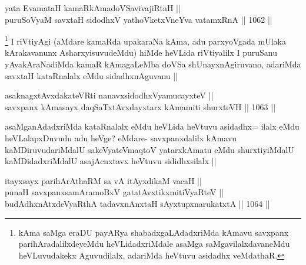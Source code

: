 
\begin{shl}
yata EvamataH kamaRkAmadoVSavivajiRtaH || \\
puruSoV\s yaM savxtaH sidodhxV yathoVketxVneYva vatamxRnA ||  1062 ||  
\end{shl}

\begin{artha}
\footnote{kAma saMga eraDU payARya shabadxgaLAdadxriMda kAmavu savxpanx parihAradalilxdeyeMdu heVLidadxriMdale asaMga saMgavilalxdavaneMdu heVLuvudakekx Aguvudilalx, adariMda heVtuvu asidadhx veMdathaR.}
I riVtiyAgi (aMdare kamaRda upakaraNa kAma, adu parxyoVgada mUlaka kArakavanunx AsharxyisuvudeMdu) hiMde heVLida riVtiyalilx I puruSanu yAvakAraNadiMda kamaR kAmagaLeMba doVSa shUnayxnAgiruvano, adariMda savxtaH kataRnalalx eMdu sidadhxnAguvanu ||
\end{artha}


\begin{shl}
asaknagxtAvxdakateVRti nanavxsidodhxV\s yamucayxteV || \\
savxpanx kAmasayx daqSaTxtAvxdayxtarx kAmamiti shurxteVH ||  1063 ||  
\end{shl}

\begin{artha}
asaMganAdadxriMda kataRnalalx eMdu heVLida heVtuvu asidadhx= ilalx eMdu heVLalapxDuvudu adu heVge? eMdare- savxpanxdalilx kAmavu kaMDiruvudariMdalU sakeVyateV\s maqtoV yatarxkAmatu eMdu shurxtiyiMdalU kaMDidadxriMdalU asajAcnxtavx heVtuvu sididhxsilalx ||
\end{artha}


\begin{shl}
itayxsayx parihArAthaRM sa vA itAyxdikaM vacaH || \\
punaH savxpanxsamAramoBxV gatatAvxtikxmitiVyaRteV || \\
budAdhxnAtxdeVyaRthA tadavxnAnxtaH sAyxtupxnarukatxtA ||  1064 ||  
\end{shl}

